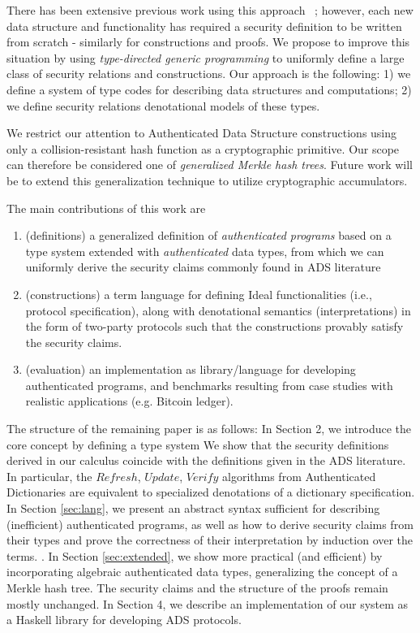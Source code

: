 \documentclass{acm_proc_article-sp}
\begin{document}
There has been extensive previous work using this approach ~\cite{Papamanthou2008}; however, each new data structure and functionality has required a security definition to be written from scratch - similarly for constructions and proofs. We propose to improve this situation by using {\em type-directed generic programming} to uniformly define a large class of security relations and constructions. Our approach is the following: 1) we define a system of type codes for describing data structures and computations; 2) we define security relations denotational models of these types.

We restrict our attention to Authenticated Data Structure constructions using only a collision-resistant hash function as a cryptographic primitive. Our scope can therefore be considered one of {\em generalized Merkle hash trees}. Future work will be to extend this generalization technique to utilize cryptographic accumulators.

The main contributions of this work are
\begin{enumerate}
 \item (definitions) a generalized definition of {\em authenticated programs} based on a type system extended with {\em authenticated} data types, from which we can uniformly derive the security claims commonly found in ADS literature
 \item (constructions) a term language for defining Ideal functionalities (i.e., protocol specification), along with denotational semantics (interpretations) in the form of two-party protocols such that the constructions provably satisfy the security claims.
 \item (evaluation) an implementation as library/language for developing authenticated programs, and benchmarks resulting from case studies with realistic applications (e.g. Bitcoin ledger).
\end{enumerate}

The structure of the remaining paper is as follows: In Section 2, we introduce the core concept by defining a type system We show that the security definitions derived in our calculus coincide with the definitions given in the ADS literature. In particular, the $Refresh$, $Update$, $Verify$ algorithms from Authenticated Dictionaries are equivalent to specialized denotations of a dictionary specification. In Section \ref{sec:lang}, we present an abstract syntax sufficient for describing (inefficient) authenticated programs, as well as how to derive security claims from their types and prove the correctness of their interpretation by induction over the terms. . In Section \ref{sec:extended}, we show more practical (and efficient) by incorporating algebraic authenticated data types, generalizing the concept of a Merkle hash tree. The security claims and the structure of the proofs remain mostly unchanged. In Section 4, we describe an implementation of our system as a Haskell library for developing ADS protocols.
\end{document}
